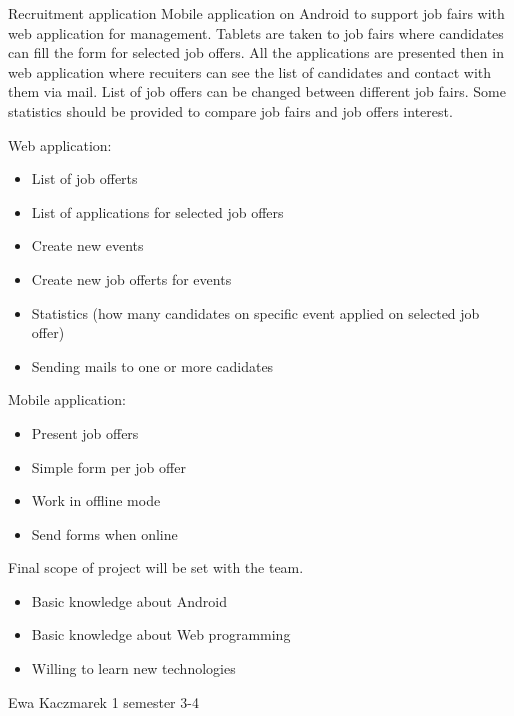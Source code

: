 \begin{project}
{Recruitment application}
{Mobile application on Android to support job fairs with web application for management. Tablets are taken to job fairs where candidates can fill the form for selected job offers. All the applications are presented then in web application where recuiters can see the list of candidates and contact with them via mail. List of job offers can be changed between different job fairs. Some statistics should be provided to compare job fairs and job offers interest.}
{
Web application:
\begin{itemize}
	\item List of job offerts
	\item List of applications for selected job offers
	\item Create new events
	\item Create new job offerts for events
	\item Statistics (how many candidates on specific event applied on selected job offer)
	\item Sending mails to one or more cadidates
\end{itemize}
\bigbreak
Mobile application:
\begin{itemize}
	\item Present job offers
	\item Simple form per job offer
	\item Work in offline mode
	\item Send forms when online
\end{itemize}
Final scope of project will be set with the team.
}
{
\begin{itemize}
	\item Basic knowledge about Android
	\item Basic knowledge about Web programming
	\item Willing to learn new technologies
\end{itemize}
}
{Ewa Kaczmarek}
{1 semester}
{3-4}
\end{project}
